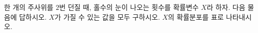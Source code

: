 한 개의 주사위를 $2$번 던질 때, 홀수의 눈이 나오는 횟수를 확률변수 $X$라 하자. 다음 물음에 답하시오.
 $X$가 가질 수 있는 값을 모두 구하시오.
 $X$의 확률분포를 표로 나타내시오.
